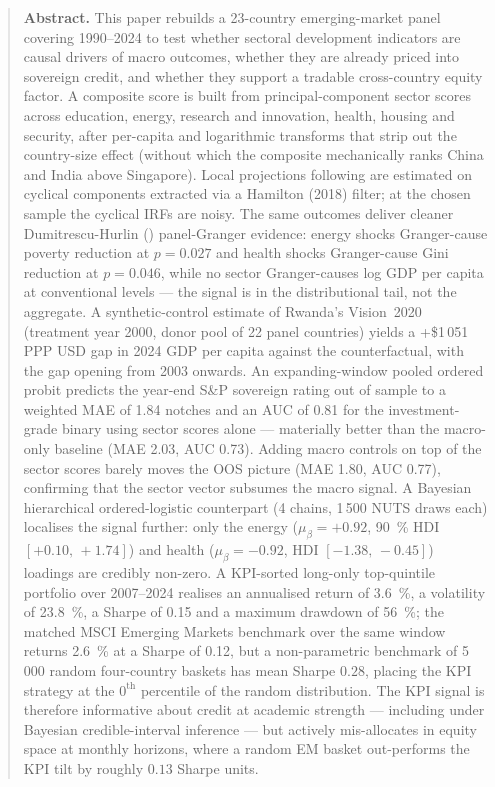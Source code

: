 \begin{quote}\small
\noindent\textbf{Abstract.} This paper rebuilds a 23-country emerging-market panel covering 1990--2024 to test whether sectoral development indicators are causal drivers of macro outcomes, whether they are already priced into sovereign credit, and whether they support a tradable cross-country equity factor. A composite score is built from principal-component sector scores across education, energy, research and innovation, health, housing and security, after per-capita and logarithmic transforms that strip out the country-size effect (without which the composite mechanically ranks China and India above Singapore). Local projections following \textcite{jorda2005} are estimated on cyclical components extracted via a Hamilton (2018) filter; at the chosen sample the cyclical IRFs are noisy. The same outcomes deliver cleaner Dumitrescu-Hurlin (\citeyear{dumitrescuhurlin2012}) panel-Granger evidence: energy shocks Granger-cause poverty reduction at $p = 0.027$ and health shocks Granger-cause Gini reduction at $p = 0.046$, while no sector Granger-causes log GDP per capita at conventional levels --- the signal is in the distributional tail, not the aggregate. A synthetic-control estimate of Rwanda's Vision~2020 (treatment year 2000, donor pool of 22 panel countries) yields a +\$1\,051 PPP USD gap in 2024 GDP per capita against the counterfactual, with the gap opening from 2003 onwards. An expanding-window pooled ordered probit predicts the year-end S\&P sovereign rating out of sample to a weighted MAE of 1.84 notches and an AUC of 0.81 for the investment-grade binary using sector scores alone --- materially better than the macro-only baseline (MAE 2.03, AUC 0.73). Adding macro controls on top of the sector scores barely moves the OOS picture (MAE 1.80, AUC 0.77), confirming that the sector vector subsumes the macro signal. A Bayesian hierarchical ordered-logistic counterpart (4 chains, 1\,500 NUTS draws each) localises the signal further: only the energy ($\mu_\beta = +0.92$, 90~\% HDI $[+0.10,\,+1.74]$) and health ($\mu_\beta = -0.92$, HDI $[-1.38,\,-0.45]$) loadings are credibly non-zero. A KPI-sorted long-only top-quintile portfolio over 2007--2024 realises an annualised return of 3.6~\%, a volatility of 23.8~\%, a Sharpe of 0.15 and a maximum drawdown of 56~\%; the matched MSCI Emerging Markets benchmark over the same window returns 2.6~\% at a Sharpe of 0.12, but a non-parametric benchmark of 5\,000 random four-country baskets has mean Sharpe $0.28$, placing the KPI strategy at the $0^{\text{th}}$ percentile of the random distribution. The KPI signal is therefore informative about credit at academic strength --- including under Bayesian credible-interval inference --- but actively mis-allocates in equity space at monthly horizons, where a random EM basket out-performs the KPI tilt by roughly $0.13$ Sharpe units.
\end{quote}
